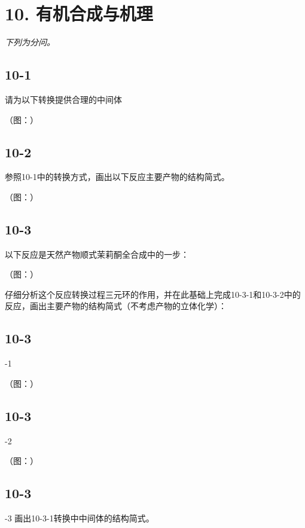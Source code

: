 \section*{10. 有机合成与机理}
\textit{下列为分问。}

\subsection*{10-1}
请为以下转换提供合理的中间体

（图：）

\subsection*{10-2}
参照10-1中的转换⽅式，画出以下反应主要产物的结构简式。

（图：）

\subsection*{10-3}
以下反应是天然产物顺式茉莉酮全合成中的⼀步：

（图：）

仔细分析这个反应转换过程三元环的作⽤，并在此基础上完成10-3-1和10-3-2中的反应，画出主要产物的结构简式（不考虑产物的⽴体化学）：

\subsection*{10-3}
-1

（图：）

\subsection*{10-3}
-2

（图：）

\subsection*{10-3}
-3 画出10-3-1转换中中间体的结构简式。

